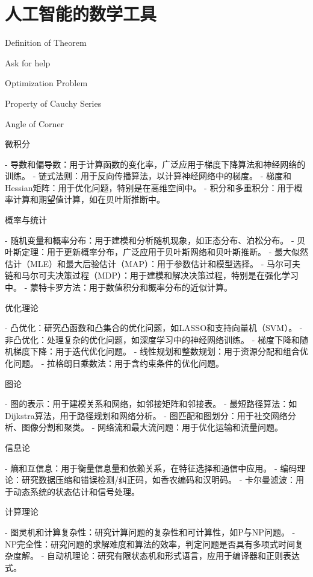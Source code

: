 \chapter{ 人工智能的数学工具}
 \begin{introduction}
  \item Definition of Theorem
  \item Ask for help
  \item Optimization Problem
  \item Property of Cauchy Series
  \item Angle of Corner
\end{introduction}





微积分

- 导数和偏导数：用于计算函数的变化率，广泛应用于梯度下降算法和神经网络的训练。
- 链式法则：用于反向传播算法，以计算神经网络中的梯度。
- 梯度和Hessian矩阵：用于优化问题，特别是在高维空间中。
- 积分和多重积分：用于概率计算和期望值计算，如在贝叶斯推断中。

概率与统计

- 随机变量和概率分布：用于建模和分析随机现象，如正态分布、泊松分布。
- 贝叶斯定理：用于更新概率分布，广泛应用于贝叶斯网络和贝叶斯推断。
- 最大似然估计（MLE）和最大后验估计（MAP）：用于参数估计和模型选择。
- 马尔可夫链和马尔可夫决策过程（MDP）：用于建模和解决决策过程，特别是在强化学习中。
- 蒙特卡罗方法：用于数值积分和概率分布的近似计算。

优化理论

- 凸优化：研究凸函数和凸集合的优化问题，如LASSO和支持向量机（SVM）。
- 非凸优化：处理复杂的优化问题，如深度学习中的神经网络训练。
- 梯度下降和随机梯度下降：用于迭代优化问题。
- 线性规划和整数规划：用于资源分配和组合优化问题。
- 拉格朗日乘数法：用于含约束条件的优化问题。

图论

- 图的表示：用于建模关系和网络，如邻接矩阵和邻接表。
- 最短路径算法：如Dijkstra算法，用于路径规划和网络分析。
- 图匹配和图划分：用于社交网络分析、图像分割和聚类。
- 网络流和最大流问题：用于优化运输和流量问题。

信息论

- 熵和互信息：用于衡量信息量和依赖关系，在特征选择和通信中应用。
- 编码理论：研究数据压缩和错误检测/纠正码，如香农编码和汉明码。
- 卡尔曼滤波：用于动态系统的状态估计和信号处理。

计算理论

- 图灵机和计算复杂性：研究计算问题的复杂性和可计算性，如P与NP问题。
- NP完全性：研究问题的求解难度和算法的效率，判定问题是否具有多项式时间复杂度解。
- 自动机理论：研究有限状态机和形式语言，应用于编译器和正则表达式。

